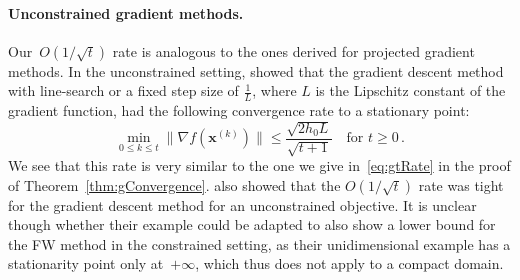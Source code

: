 \documentclass{article}
\newcommand{\x}{\bm{x}}
\newcommand{\0}{\mathbf{0}} %
\begin{document}
\paragraph{Unconstrained gradient methods.} Our~$O(1/\sqrt{t})$ rate is analogous to the ones derived for projected gradient methods. In the unconstrained setting, \citet[Inequality~(1.2.15)]{Nesterov:2004:lectures} showed that the gradient descent method with line-search or a fixed step size of $\frac{1}{L}$, where $L$ is the Lipschitz constant of the gradient function, had the following convergence rate to a stationary point:
\begin{equation} \label{eq:gradientConvergence}
\min_{0 \leq k \leq t} \| \nabla f(\x^{(k)}) \| \leq \frac{\sqrt{2 h_0 L}}{\sqrt{t+1}} \quad \text{for $t \geq 0$} \, .
\end{equation}
We see that this rate is very similar to the one we give in~\eqref{eq:gtRate} in the proof of Theorem~\ref{thm:gConvergence}.
\citet{Cartis2010} also showed that the $O(1/\sqrt{t})$ rate was tight for the gradient descent method for an unconstrained objective. It is unclear though whether their example could be adapted to also show a lower bound for the FW method in the constrained setting, as their unidimensional example has a stationarity point only at~$+\infty$, which thus does not apply to a compact domain.
\end{document}

